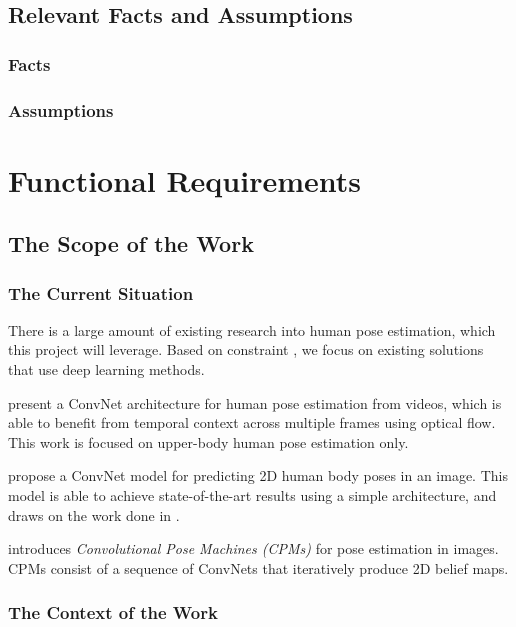 \documentclass{scrreprt}
\begin{document}
\section{Relevant Facts and Assumptions}

\subsection{Facts}

\subsection{Assumptions}

\chapter{Functional Requirements}

\section{The Scope of the Work}

\subsection{The Current Situation}

There is a large amount of existing research into human pose estimation, which
this project will leverage. Based on constraint
\theHumanPoseDeepLearningConstraint, we focus on existing solutions that use
deep learning methods.

\cite{DBLP:journals/corr/PfisterCZ15} present a ConvNet architecture for human
pose estimation from videos, which is able to benefit from temporal context
across multiple frames using optical flow. This work is focused on upper-body
human pose estimation only.

\cite{DBLP:journals/corr/BelagiannisZ16} propose a ConvNet model for predicting
2D human body poses in an image. This model is able to achieve state-of-the-art
results using a simple architecture, and draws on the work done in
\cite{DBLP:journals/corr/PfisterCZ15}.

\cite{DBLP:journals/corr/WeiRKS16} introduces \textit{Convolutional Pose
Machines (CPMs)} for pose estimation in images. CPMs consist of a sequence of
ConvNets that iteratively produce 2D belief maps.

\subsection{The Context of the Work}
\end{document}
